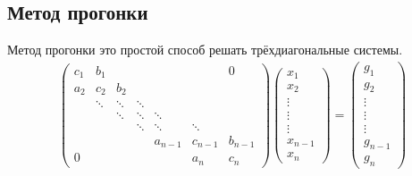 \subsection{Метод прогонки}

Метод прогонки это простой способ решать трёхдиагональные системы.
\begin{align*}
  \begin{pmatrix}
    c_1 & b_1 & &  &  &  & 0 \\
    a_2 & c_2 & b_2 &  & & & \\
     &   \ddots & \ddots & \ddots & & & \\
     & &  \ddots & \ddots & \ddots & &  \\
     & & & \ddots & \ddots & \ddots &  \\
     &  &  & & a_{n-1} & c_{n-1} & b_{n-1} \\
     0 & & & &  &a_n & c_n
  \end{pmatrix}
  \begin{pmatrix}
    x_1 \\
    x_2 \\
    \vdots \\
    \vdots \\
    \vdots \\
    x_{n-1} \\
    x_n
  \end{pmatrix} =
  \begin{pmatrix}
    g_1 \\
    g_2 \\
    \vdots \\
    \vdots \\
    \vdots \\
    g_{n-1} \\
    g_n
  \end{pmatrix}
\end{align*}
